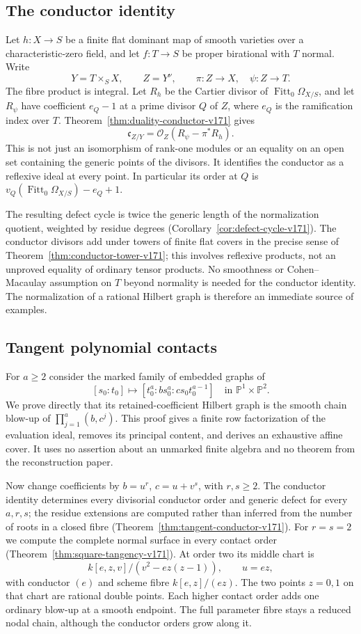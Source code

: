 \documentclass[11pt,reqno]{amsart}
\numberwithin{equation}{section}
\theoremstyle{definition}\newtheorem{definition}[theorem]{Definition}
\theoremstyle{remark}\newtheorem{remark}[theorem]{Remark}
\newcommand{\Pj}{\mathbb P}\newcommand{\A}{\mathbb A}
\newcommand{\OO}{\mathcal O}\newcommand{\II}{\mathcal I}
\begin{document}
\subsection{The conductor identity}
Let $h:X\to S$ be a finite flat dominant map of smooth varieties over
a characteristic-zero field, and let $f:T\to S$ be proper birational
with $T$ normal. Write
\[
 Y=T\times_S X,\qquad Z=Y^\nu,\qquad
 \pi:Z\to X,\quad \psi:Z\to T.
\]
The fibre product is integral. Let $R_h$ be the Cartier divisor of
$\operatorname{Fitt}_0\Omega_{X/S}$, and let $R_\psi$ have coefficient
$e_Q-1$ at a prime divisor $Q$ of $Z$, where $e_Q$ is the ramification
index over $T$. Theorem~\ref{thm:duality-conductor-v171} gives
\[
 \mathfrak c_{Z/Y}=\OO_Z(R_\psi-\pi^*R_h).
\]
This is not just an isomorphism of rank-one modules or an equality
on an open set containing the generic points of the divisors. It
identifies the conductor as a reflexive ideal at every point. In
particular its order at $Q$ is
$v_Q(\operatorname{Fitt}_0\Omega_{X/S})-e_Q+1$.

The resulting defect cycle is twice the generic length of the
normalization quotient, weighted by residue degrees
(Corollary~\ref{cor:defect-cycle-v171}). The conductor divisors add
under towers of finite flat covers in the precise sense of
Theorem~\ref{thm:conductor-tower-v171}; this involves reflexive
products, not an unproved equality of ordinary tensor products.
No smoothness or Cohen--Macaulay assumption on $T$ beyond normality
is needed for the conductor identity. The normalization of a rational
Hilbert graph is therefore an immediate source of examples.

\subsection{Tangent polynomial contacts}
For $a\geq2$ consider the marked family of embedded graphs of
\[
 [s_0:t_0]\longmapsto[t_0^a:b s_0^a:cs_0t_0^{a-1}]
 \quad\text{in }\Pj^1\times\Pj^2.
\]
We prove directly that its retained-coefficient Hilbert graph is the
smooth chain blow-up of $\prod_{j=1}^a(b,c^j)$. This proof gives a
finite row factorization of the evaluation ideal, removes its
principal content, and derives an exhaustive affine cover. It uses
no assertion about an unmarked finite algebra and no theorem from
the reconstruction paper.

Now change coefficients by $b=u^r$, $c=u+v^s$, with $r,s\geq2$.
The conductor identity determines every divisorial conductor order
and generic defect for every $a,r,s$; the residue extensions are
computed rather than inferred from the number of roots in a closed
fibre (Theorem~\ref{thm:tangent-conductor-v171}). For $r=s=2$ we
compute the complete normal surface in every contact order
(Theorem~\ref{thm:square-tangency-v171}). At order two its middle
chart is
\[
 k[e,z,v]/(v^2-ez(z-1)),\qquad u=ez,
\]
with conductor $(e)$ and scheme fibre $k[e,z]/(ez)$. The two points
$z=0,1$ on that chart are rational double points. Each higher contact
order adds one ordinary blow-up at a smooth endpoint. The full
parameter fibre stays a reduced nodal chain, although the conductor
orders grow along it.
\end{document}
